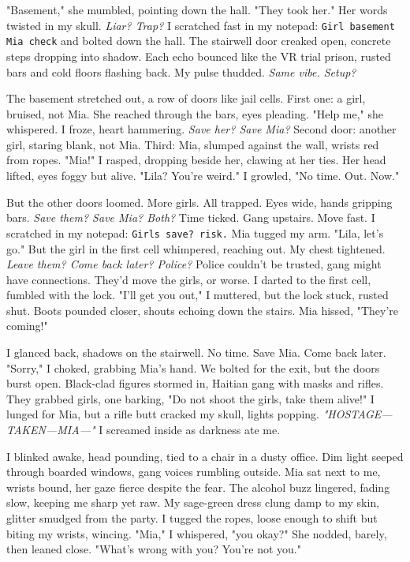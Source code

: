 \documentclass[12pt]{article}
\newcommand{\note}[1]{\texttt{#1}}
\begin{document}
"Basement," she mumbled, pointing down the hall. "They took her." Her words twisted in my skull. \textit{Liar? Trap?} I scratched fast in my notepad: \note{Girl basement Mia check} and bolted down the hall. The stairwell door creaked open, concrete steps dropping into shadow. Each echo bounced like the VR trial prison, rusted bars and cold floors flashing back. My pulse thudded. \textit{Same vibe. Setup?}

The basement stretched out, a row of doors like jail cells. First one: a girl, bruised, not \textnormal{Mia}. She reached through the bars, eyes pleading. "Help me," she whispered. I froze, heart hammering. \textit{Save her? Save \textnormal{Mia}?} Second door: another girl, staring blank, not \textnormal{Mia}. Third: \textnormal{Mia}, slumped against the wall, wrists red from ropes. "\textnormal{Mia}!" I rasped, dropping beside her, clawing at her ties. Her head lifted, eyes foggy but alive. "\textnormal{Lila}? You’re weird." I growled, "No time. Out. Now."

But the other doors loomed. More girls. All trapped. Eyes wide, hands gripping bars. \textit{Save them? Save \textnormal{Mia}? Both?} Time ticked. Gang upstairs. Move fast. I scratched in my notepad: \note{Girls save? risk.} \textnormal{Mia} tugged my arm. "\textnormal{Lila}, let’s go." But the girl in the first cell whimpered, reaching out. My chest tightened. \textit{Leave them? Come back later? Police?} Police couldn’t be trusted, gang might have connections. They’d move the girls, or worse. I darted to the first cell, fumbled with the lock. "I’ll get you out," I muttered, but the lock stuck, rusted shut. Boots pounded closer, shouts echoing down the stairs. \textnormal{Mia} hissed, "They’re coming!"

I glanced back, shadows on the stairwell. No time. Save \textnormal{Mia}. Come back later. "Sorry," I choked, grabbing \textnormal{Mia}’s hand. We bolted for the exit, but the doors burst open. Black-clad figures stormed in, Haitian gang with masks and rifles. They grabbed girls, one barking, "Do not shoot the girls, take them alive!" I lunged for \textnormal{Mia}, but a rifle butt cracked my skull, lights popping. \textit{"HOSTAGE—TAKEN—MIA—"} I screamed inside as darkness ate me.

I blinked awake, head pounding, tied to a chair in a dusty office. Dim light seeped through boarded windows, gang voices rumbling outside. \textnormal{Mia} sat next to me, wrists bound, her gaze fierce despite the fear. The alcohol buzz lingered, fading slow, keeping me sharp yet raw. My sage-green dress clung damp to my skin, glitter smudged from the party. I tugged the ropes, loose enough to shift but biting my wrists, wincing. "\textnormal{Mia}," I whispered, "you okay?" She nodded, barely, then leaned close. "What’s wrong with you? You’re not you."
\end{document}
